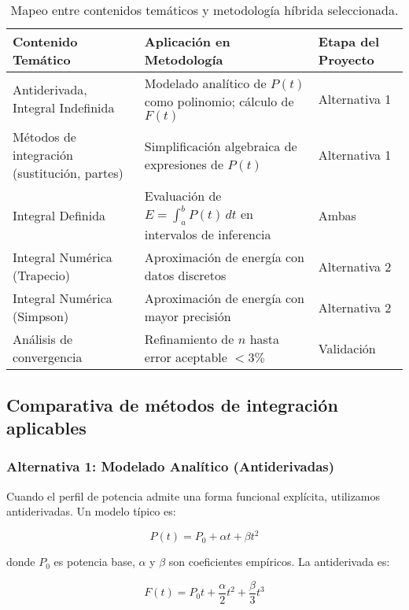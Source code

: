 \begin{table}[H]
    \centering
    \caption{Mapeo entre contenidos temáticos y metodología híbrida seleccionada.}
    \label{tab:contenidos}
    \begin{tabular}{p{4cm}p{5.5cm}p{4cm}}
    \toprule
    \textbf{Contenido Temático} & \textbf{Aplicación en Metodología} & \textbf{Etapa del Proyecto} \\
    \midrule
    Antiderivada, Integral Indefinida & Modelado analítico de $P(t)$ como polinomio; cálculo de $F(t)$ & Alternativa 1 \\
    \midrule
    Métodos de integración (sustitución, partes) & Simplificación algebraica de expresiones de $P(t)$ & Alternativa 1 \\
    \midrule
    Integral Definida & Evaluación de $E = \int_a^b P(t)\,dt$ en intervalos de inferencia & Ambas \\
    \midrule
    Integral Numérica (Trapecio) & Aproximación de energía con datos discretos & Alternativa 2 \\
    \midrule
    Integral Numérica (Simpson) & Aproximación de energía con mayor precisión & Alternativa 2 \\
    \midrule
    Análisis de convergencia & Refinamiento de $n$ hasta error aceptable $< 3\%$ & Validación \\
    \bottomrule
    \end{tabular}
\end{table}

\subsection{Comparativa de métodos de integración aplicables}

\subsubsection*{Alternativa 1: Modelado Analítico (Antiderivadas)}

Cuando el perfil de potencia admite una forma funcional explícita, utilizamos antiderivadas. Un modelo típico es:

\begin{equation}
P(t) = P_0 + \alpha t + \beta t^2
\end{equation}

donde $P_0$ es potencia base, $\alpha$ y $\beta$ son coeficientes empíricos. La antiderivada es:

\begin{equation}
F(t) = P_0 t + \frac{\alpha}{2}t^2 + \frac{\beta}{3}t^3
\end{equation}


